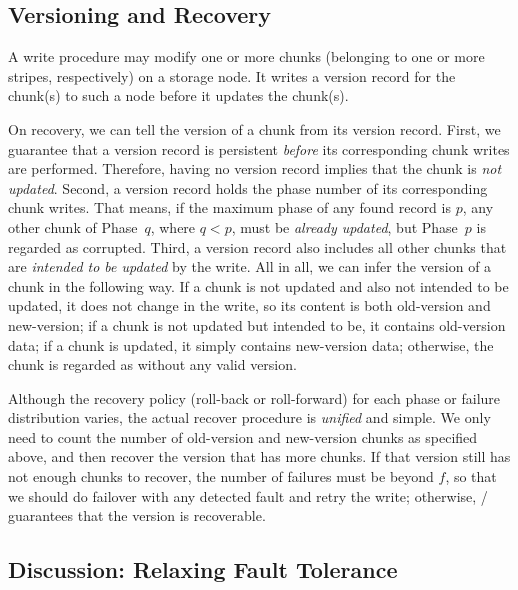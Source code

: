 \subsection{Versioning and Recovery}
\vspace{-0.5em}

A write procedure may modify one or more chunks (belonging to one or more
stripes, respectively) on a storage node. It writes a version record for the
chunk(s) to such a node before it updates the chunk(s).

On recovery, we can tell the version of a chunk from its version record. First,
we guarantee that a version record is persistent \emph{before} its
corresponding chunk writes are performed. Therefore, having no version record
implies that the chunk is \emph{not updated}. Second, a version record holds
the phase number of its corresponding chunk writes. That means, if the maximum
phase of any found record is $p$, any other chunk of Phase~$q$, where $q<p$,
must be \emph{already updated}, but Phase~$p$ is regarded as corrupted. Third,
a version record also includes all other chunks that are \emph{intended to be
updated} by the write.  All in all, we can infer the version of a chunk in the
following way. If a chunk is not updated and also not intended to be updated,
it does not change in the write, so its content is both old-version and
new-version; if a chunk is not updated but intended to be, it contains
old-version data; if a chunk is updated, it simply contains new-version data;
otherwise, the chunk is regarded as without any valid version.

Although the recovery policy (roll-back or roll-forward) for each phase or
failure distribution varies, the actual recover procedure is \emph{unified} and
simple. We only need to count the number of old-version and new-version chunks
as specified above, and then recover the version that has more chunks. If that
version still has not enough chunks to recover, the number of failures must be
beyond $f$, so that we should do failover with any detected fault and retry the
write; otherwise, \protocol/ guarantees that the version is recoverable.

\vspace{-1em}
\subsection{Discussion: Relaxing Fault Tolerance}
\vspace{-0.5em}

